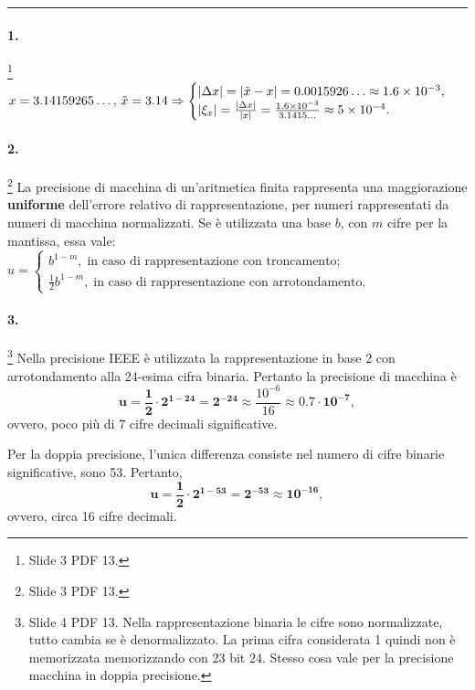 \hrule

\paragraph{1.}\footnote{Slide 3 PDF 13.} $x = 3.14159265\hdots,\, \Tilde{x}=3.14\Rightarrow\begin{cases}
	|\Delta x|=|\Tilde{x}-x|=0.0015926\hdots\approx 1.6\times 10^{-3},\\
	|\xi_x|=\frac{|\Delta x|}{|x|}=\frac{1.6\times 10^{-3}}{3.1415\hdots}\approx 5\times 10^{-4}.
\end{cases}$

\paragraph{2.}\footnote{Slide 3 PDF 13.} La precisione di macchina di un'aritmetica finita rappresenta una maggiorazione \textbf{uniforme} dell'errore relativo di rappresentazione, per numeri rappresentati da numeri di macchina normalizzati. Se è utilizzata una base $b$, con $m$ cifre per la mantissa, essa vale: $u=\begin{cases}
	b^{1-m},\;\text{in caso di rappresentazione con troncamento};\\
	\frac{1}{2}b^{1-m},\;\text{in caso di rappresentazione con arrotondamento.}
\end{cases}$

\paragraph{3.}\footnote{Slide 4 PDF 13. Nella rappresentazione binaria le cifre sono normalizzate, tutto cambia se è denormalizzato. La prima cifra considerata 1 quindi non è memorizzata memorizzando con 23 bit 24. Stesso cosa vale per la precisione macchina in doppia precisione.} Nella precisione IEEE è utilizzata la rappresentazione in base 2 con arrotondamento alla 24-esima cifra binaria. Pertanto la precisione di macchina è
\begin{equation*}
	\boldsymbol{u=\frac{1}{2}\cdot 2^{1-24}=2^{-24}}\approx\frac{10^{-6}}{16}\approx\boldsymbol{0.7\cdot 10^{-7}},
\end{equation*}
ovvero, poco più di 7 cifre decimali significative.

\noindent Per la doppia precisione, l'unica differenza consiste nel numero di cifre binarie significative, sono 53. Pertanto, 
\begin{equation*}
	\boldsymbol{u=\frac{1}{2}\cdot 2^{1-53}=2^{-53}\approx 10^{-16}},
\end{equation*}
ovvero, circa 16 cifre decimali.

